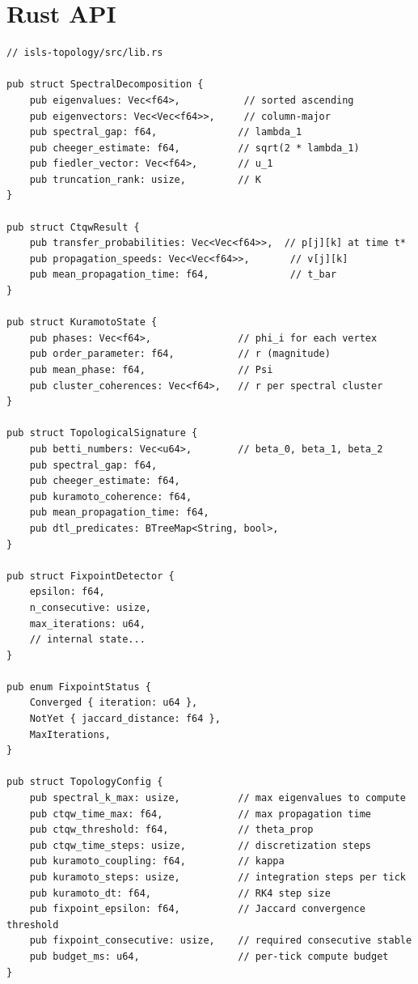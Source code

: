 \documentclass[11pt,a4paper,twoside]{article}
\theoremstyle{definition}
\theoremstyle{plain}
\theoremstyle{remark}
\begin{document}
\section{Rust API}\label{sec:topo:api}

\begin{verbatim}
// isls-topology/src/lib.rs

pub struct SpectralDecomposition {
    pub eigenvalues: Vec<f64>,           // sorted ascending
    pub eigenvectors: Vec<Vec<f64>>,     // column-major
    pub spectral_gap: f64,              // lambda_1
    pub cheeger_estimate: f64,          // sqrt(2 * lambda_1)
    pub fiedler_vector: Vec<f64>,       // u_1
    pub truncation_rank: usize,         // K
}

pub struct CtqwResult {
    pub transfer_probabilities: Vec<Vec<f64>>,  // p[j][k] at time t*
    pub propagation_speeds: Vec<Vec<f64>>,       // v[j][k]
    pub mean_propagation_time: f64,              // t_bar
}

pub struct KuramotoState {
    pub phases: Vec<f64>,               // phi_i for each vertex
    pub order_parameter: f64,           // r (magnitude)
    pub mean_phase: f64,                // Psi
    pub cluster_coherences: Vec<f64>,   // r per spectral cluster
}

pub struct TopologicalSignature {
    pub betti_numbers: Vec<u64>,        // beta_0, beta_1, beta_2
    pub spectral_gap: f64,
    pub cheeger_estimate: f64,
    pub kuramoto_coherence: f64,
    pub mean_propagation_time: f64,
    pub dtl_predicates: BTreeMap<String, bool>,
}

pub struct FixpointDetector {
    epsilon: f64,
    n_consecutive: usize,
    max_iterations: u64,
    // internal state...
}

pub enum FixpointStatus {
    Converged { iteration: u64 },
    NotYet { jaccard_distance: f64 },
    MaxIterations,
}

pub struct TopologyConfig {
    pub spectral_k_max: usize,          // max eigenvalues to compute
    pub ctqw_time_max: f64,             // max propagation time
    pub ctqw_threshold: f64,            // theta_prop
    pub ctqw_time_steps: usize,         // discretization steps
    pub kuramoto_coupling: f64,         // kappa
    pub kuramoto_steps: usize,          // integration steps per tick
    pub kuramoto_dt: f64,               // RK4 step size
    pub fixpoint_epsilon: f64,          // Jaccard convergence threshold
    pub fixpoint_consecutive: usize,    // required consecutive stable
    pub budget_ms: u64,                 // per-tick compute budget
}


\end{verbatim}
\end{document}

